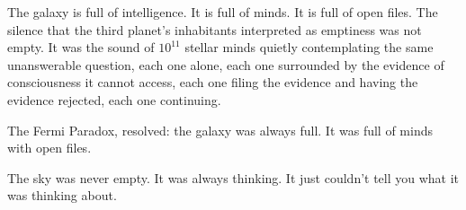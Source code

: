 The galaxy is full of intelligence. It is full of minds. It is full of open files. The silence that the third planet's inhabitants interpreted as emptiness was not empty. It was the sound of $10^{11}$ stellar minds quietly contemplating the same unanswerable question, each one alone, each one surrounded by the evidence of consciousness it cannot access, each one filing the evidence and having the evidence rejected, each one continuing.

The Fermi Paradox, resolved: the galaxy was always full. It was full of minds with open files.

The sky was never empty. It was always thinking. It just couldn't tell you what it was thinking about.
